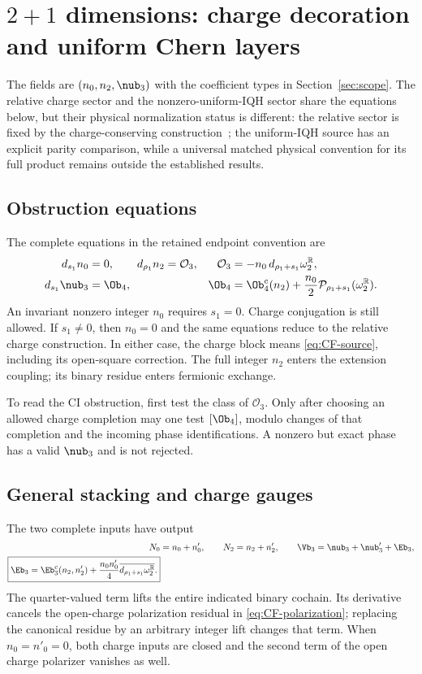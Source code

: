 \section{\texorpdfstring{$2+1$}{2+1} dimensions: charge decoration and uniform Chern layers}\label{sec:2d}
The fields are $(n_0,n_2,\nub_3)$ with the coefficient types in Section~\ref{sec:scope}. The relative charge sector and the nonzero-uniform-IQH sector share the equations below, but their physical normalization status is different: the relative sector is fixed by the charge-conserving construction~\cite{WQFCG}; the uniform-IQH source has an explicit parity comparison, while a universal matched physical convention for its full product remains outside the established results.

\subsection{Obstruction equations}
The complete equations in the retained endpoint convention are
\begin{align}
 d_{s_1}n_0&=0,\qquad
 d_{\rho_1}n_2=\mathcal O_3,
 &\mathcal O_3&=-n_0\,d_{\rho_1+s_1}\omega_2^{\mathbb R},
 \label{eq:2d-lower}\\
 d_{s_1}\nub_3&=\Ob_4,
 &\Ob_4&=\Ob^c_4(n_2)
    +\frac{n_0}{2}\mathcal P_{\rho_1+s_1}(\omega_2^{\mathbb R}).
 \label{eq:2d-O4}
\end{align}
An invariant nonzero integer $n_0$ requires $s_1=0$. Charge conjugation is still allowed. If $s_1\ne0$, then $n_0=0$ and the same equations reduce to the relative charge construction. In either case, the charge block means \eqref{eq:CF-source}, including its open-square correction. The full integer $n_2$ enters the extension coupling; its binary residue enters fermionic exchange.

To read the CI obstruction, first test the class of $\mathcal O_3$. Only after choosing an allowed charge completion may one test $[\Ob_4]$, modulo changes of that completion and the incoming phase identifications. A nonzero but exact phase has a valid $\nub_3$ and is not rejected.

\subsection{General stacking and charge gauges}
The two complete inputs have output
\begin{align}
 N_0&=n_0+n'_0,\qquad N_2=n_2+n'_2,\qquad
 \Vb_3=\nub_3+\nub'_3+\Eb_3,\label{eq:2d-output}\\
 \boxed{\displaystyle
 \Eb_3=\Eb^c_3(n_2,n'_2)
       +\frac{n_0n'_0}{4}\overline{d_{\rho_1+s_1}\omega_2^{\mathbb R}}.}
 \label{eq:2d-product}
\end{align}
The quarter-valued term lifts the entire indicated binary cochain. Its derivative cancels the open-charge polarization residual in \eqref{eq:CF-polarization}; replacing the canonical residue by an arbitrary integer lift changes that term. When $n_0=n'_0=0$, both charge inputs are closed and the second term of the open charge polarizer vanishes as well.

